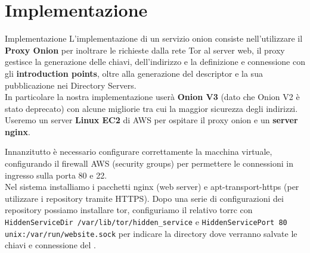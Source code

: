 \section{Implementazione}
\begin{frame}{Implementazione}
    L'implementazione di un servizio onion consiste nell'utilizzare il \textbf{Proxy Onion} per inoltrare le richieste dalla rete Tor al server web, il proxy gestisce la generazione delle chiavi, dell'indirizzo e la definizione e connessione con gli \textbf{introduction points}, oltre alla generazione del descriptor e la sua pubblicazione nei Directory Servers. \\
    In particolare la nostra implementazione userà \textbf{Onion V3} (dato che Onion V2 è stato deprecato) con alcune migliorie tra cui la maggior sicurezza degli indirizzi. \\
    Useremo un server \textbf{Linux EC2} di AWS per ospitare il proxy onion e un \textbf{server nginx}.
\end{frame}

\begin{frame}
    Innanzitutto è necessario configurare correttamente la macchina virtuale, configurando il firewall AWS (security groups) per permettere le connessioni in ingresso sulla porta 80 e 22. \\
    Nel sistema installiamo i pacchetti nginx (web server) e apt-transport-https (per utilizzare i repository tramite HTTPS). 
    Dopo una serie di configurazioni dei repository possiamo installare tor, configuriamo il relativo torrc con \lstinline{HiddenServiceDir /var/lib/tor/hidden_service} e \lstinline{HiddenServicePort 80 unix:/var/run/website.sock} per indicare la directory dove verranno salvate le chiavi e connessione del . \\
    

\end{frame}